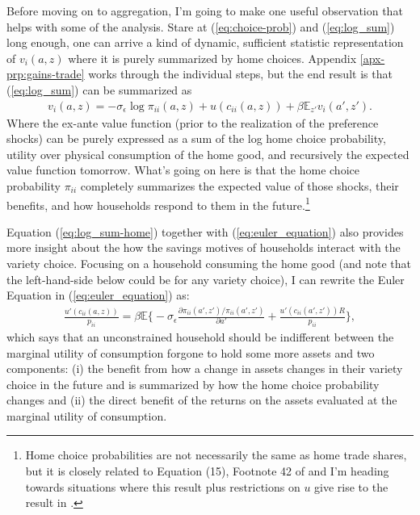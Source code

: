 \documentclass[12pt,pdftex]{article}
\begin{document}
\begin{onehalfspacing}
Before moving on to aggregation, I'm going to make one useful observation that helps with some of the analysis. Stare at (\ref{eq:choice-prob}) and (\ref{eq:log_sum}) long enough, one can arrive a kind of dynamic, sufficient statistic representation of $v_i(a, z)$ where it is purely summarized by home choices. Appendix \ref{apx-prp:gains-trade} works through the individual steps, but the end result is that (\ref{eq:log_sum}) can be summarized as
\begin{align}
v_i(a, z) = -\sigma_{\epsilon} \log \pi_{ii}(a,z) + u(c_{ii}(a,z)) + \beta \mathbb{E}_{z'} v_{i}(a',z').
\label{eq:log_sum-home}
\end{align}
Where the ex-ante value function (prior to the realization of the preference shocks) can be purely expressed as a sum of the log home choice probability, utility over physical consumption of the home good, and recursively the expected value function tomorrow. What's going on here is that the home choice probability $\pi_{ii}$ completely summarizes the expected value of those shocks, their benefits, and how households respond to them in the future.\footnote{Home choice probabilities are not necessarily the same as home trade shares, but it is closely related to Equation (15), Footnote 42 of \citet{eaton2002technology} and I'm heading towards situations where this result plus restrictions on $u$ give rise to the result in \citet{arkolakis2012new}.}

Equation (\ref{eq:log_sum-home}) together with (\ref{eq:euler_equation}) also provides more insight about the how the savings motives of households interact with the variety choice. Focusing on a household consuming the home good (and note that the left-hand-side below could be for any variety choice), I can rewrite the Euler Equation in (\ref{eq:euler_equation}) as:
\begin{align}
\frac{u'(c_{ii}(a,z))}{p_{ii}} = \beta \mathbb{E} \bigg \{ -\sigma_{\epsilon} \frac{\partial \pi_{ii}(a',z') / \pi_{ii}(a',z')}{\partial a'} + \frac{u'(c_{ii}(a',z'))R}{p_{ii}} \bigg \},
\label{eq:euler_equation-home}
\end{align}
which says that an unconstrained household should be indifferent between the marginal utility of consumption forgone to hold some more assets and two components: (i) the benefit from how a change in assets changes in their variety choice in the future and is summarized by how the home choice probability changes and (ii) the direct benefit of the returns on the assets evaluated at the marginal utility of consumption.


\end{onehalfspacing}
\end{document}
